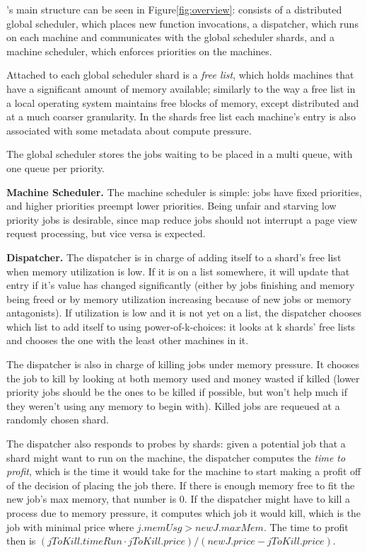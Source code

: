 \sys{}'s main structure can be seen in Figure\ref{fig:overview}: \sys{} consists
of a distributed global scheduler, which places new function invocations, a
dispatcher, which runs on each machine and communicates with the global
scheduler shards, and a machine scheduler, which enforces priorities on the
machines.

Attached to each global scheduler shard is a \textit{free list}, which holds
machines that have a significant amount of memory available; similarly to the
way a free list in a local operating system maintains free blocks of memory,
except distributed and at a much coarser granularity. In the shards free list
each machine's entry is also associated with some metadata about compute
pressure.

The global scheduler stores the jobs waiting to be placed in a multi queue, with
one queue per priority.


\textbf{Machine Scheduler.}
The machine scheduler is simple: jobs have fixed priorities, and higher
priorities preempt lower priorities. Being unfair and starving low priority
jobs is desirable, since map reduce jobs should not interrupt a page view
request processing, but vice versa is expected.


\textbf{Dispatcher.}
The dispatcher is in charge of adding itself to a shard's free list when memory
utilization is low. If it is on a list somewhere, it will update that entry if
it's value has changed significantly (either by jobs finishing and memory being
freed or by memory utilization increasing because of new jobs or memory
antagonists). If utilization is low and it is not yet on a list, the dispatcher
chooses which list to add itself to using power-of-k-choices: it looks at k
shards' free lists and chooses the one with the least other machines in it.

The dispatcher is also in charge of killing jobs under memory pressure. It
chooses the job to kill by looking at both memory used and money wasted if
killed (lower priority jobs should be the ones to be killed if possible, but
won't help much if they weren't using any memory to begin with). Killed jobs are
requeued at a randomly chosen shard.

The dispatcher also responds to probes by shards: given a potential job that a
shard might want to run on the machine, the dispatcher computes the \textit{time
to profit}, which is the time it would take for the machine to start making a
profit off of the decision of placing the job there. If there is enough memory
free to fit the new job's max memory, that number is 0. If the dispatcher might
have to kill a process due to memory pressure, it computes which job it would
kill, which is the job with minimal price where $j.memUsg > newJ.maxMem$. The
time to profit then is $(jToKill.timeRun \cdot jToKill.price) / (newJ.price
- jToKill.price)$.


